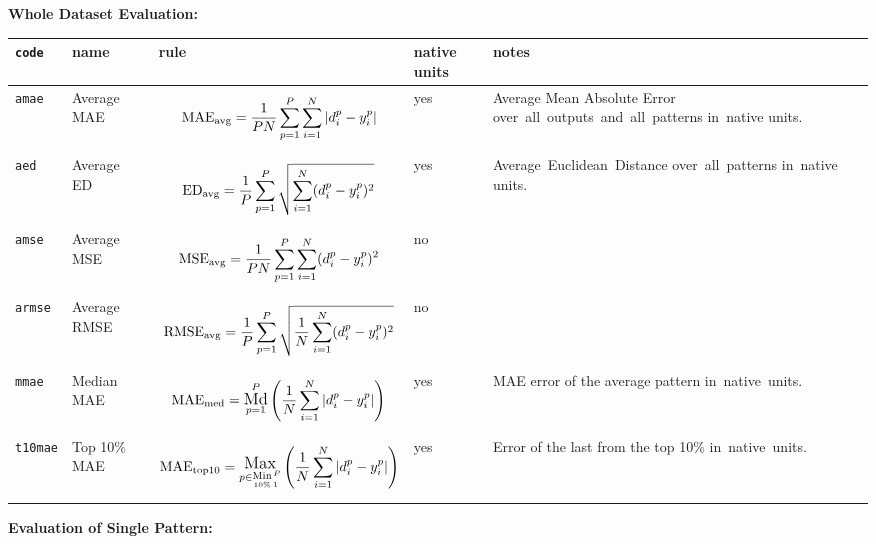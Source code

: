 \documentclass{article}
\newcommand*{\md}[3]{{\mathop{\mathlarger{\rm Md}}_{#1=#2}^#3}}
\newcommand*{\maxmin}[4]{{\raisebox{2pt}{$\mathop{\mathlarger{\mathlarger{\rm Max}}}\limits_{{\raisebox{-1pt}{$\scriptstyle #2 \in$}}{\underset{#1\%}{\rm Min}_{\raisebox{2pt}{$\scriptscriptstyle \kern 1pt #3$}}^{\kern 1pt #4}}}$}}}
\begin{document}
{\Large\bf Whole Dataset Evaluation:}
\bigskip

\begin{center}
\renewcommand{\arraystretch}{1.0}
\begin{tabular}{M{4em}M{10em}|M{20em}|M{3em}|M{20em}}
 {\tt code} & name & rule & native units & notes \\\hline\hline

 {\tt amae} & Average MAE & $$ {\rm MAE_{avg}} = \frac{1}{PN} \sum_{p=1}^P \sum_{i=1}^N |d_i^p-y_i^p| $$ & yes & Average Mean Absolute Error over~all~outputs~and~all~patterns in~native units. \\

 {\tt aed} & Average ED & $$ {\rm ED_{avg}} = \frac{1}{P} \sum_{p=1}^P \sqrt{ \sum_{i=1}^N (d_i^p-y_i^p)^2 } $$ & yes & Average~Euclidean~Distance over~all~patterns in~native units. \\

 {\tt amse} & Average MSE & $$ {\rm MSE_{avg}} = \frac{1}{PN} \sum_{p=1}^P \sum_{i=1}^N (d_i^p-y_i^p)^2 $$ & no & \\

 {\tt armse} & Average RMSE & $$ {\rm RMSE_{avg}} = \frac{1}{P} \sum_{p=1}^P \sqrt{ \frac{1}{N} \sum_{i=1}^N (d_i^p-y_i^p)^2 } $$ & no & \\\hline

 {\tt mmae} & Median MAE & $$ {\rm MAE_{med}} =  \md{p}{1}{P} \left( \frac{1}{N} \sum_{i=1}^N |d_i^p-y_i^p| \right) $$ & yes & MAE error of the average pattern in~native~units. \\

 {\tt t10mae} & Top 10\% MAE & $$ {\rm MAE_{top10}} =  \maxmin{10}{p}{1}{P} \left( \frac{1}{N} \sum_{i=1}^N |d_i^p-y_i^p| \right) $$ & yes & Error of the last from the top 10\% in~native~units. \\

\end{tabular}
\end{center}
\newpage


{\Large\bf Evaluation of Single Pattern:}
\bigskip
\bigskip
\end{document}
